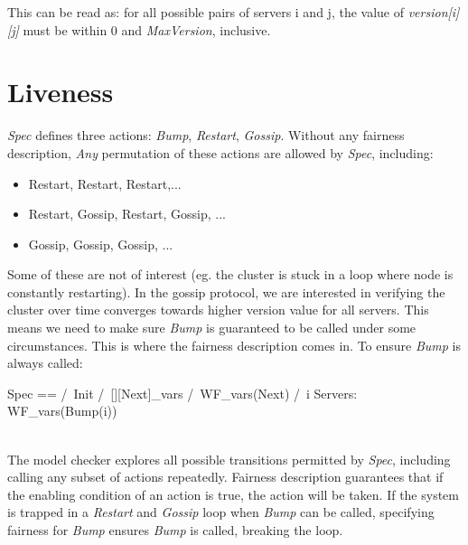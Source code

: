 This can be read as: for all possible pairs of servers i and j, the value of
\textit{version[i][j]} must be within 0 and \textit{MaxVersion}, inclusive.

\section{Liveness}

\textit{Spec} defines three actions: \textit{Bump}, \textit{Restart},
\textit{Gossip}. Without any fairness description, \textit{Any} permutation of
these actions are allowed by \textit{Spec}, including:
\begin{itemize}
    \item Restart, Restart, Restart,...
    \item Restart, Gossip, Restart, Gossip, ... 
    \item Gossip, Gossip, Gossip, ... 
\end{itemize}

Some of these are not of interest (eg. the cluster is stuck in a loop where node
is constantly restarting). In the gossip protocol, we are interested in
verifying the cluster over time converges towards higher version value for all
servers. This means we need to make sure \textit{Bump} is guaranteed to be
called under some circumstances. This is where the fairness description comes
in. To ensure \textit{Bump} is always called:\\

\begin{tla}
Spec ==
  /\ Init
  /\ [][Next]_vars
  /\ WF_vars(Next)
  /\ \A i \in Servers: 
    WF_vars(Bump(i))
\end{tla}
\begin{tlatex}
%
%
%
%
%
%
\end{tlatex}
\\

The model checker explores all possible transitions permitted by \textit{Spec}, 
including calling any subset of actions repeatedly.  Fairness description
guarantees that if the enabling condition of an action is true, the action will
be taken. If the system is trapped in a \textit{Restart} and \textit{Gossip}
loop when \textit{Bump} can be called, specifying fairness for \textit{Bump}
ensures \textit{Bump} is called, breaking the loop.\\


